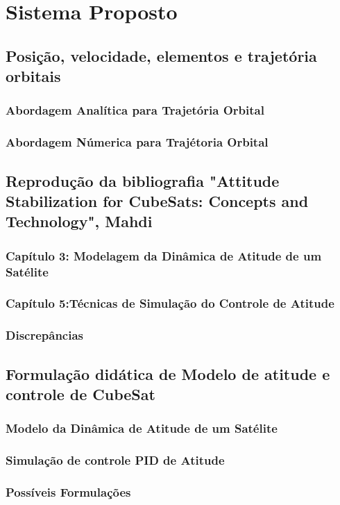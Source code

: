 \chapter{Sistema Proposto}\label{cap:proposta}

\lipsum[12]

\section{Posição, velocidade, elementos e trajetória orbitais}
\lipsum[12]
\subsection{Abordagem Analítica para Trajetória Orbital}
\lipsum[12]
\subsection{Abordagem Númerica para Trajétoria Orbital}
\lipsum[12]

\section{Reprodução da bibliografia "Attitude Stabilization for CubeSats: Concepts and Technology", Mahdi}
\lipsum[12]
\subsection{Capítulo 3: Modelagem da Dinâmica de Atitude de um Satélite}
\lipsum[12]
\subsection{Capítulo 5:Técnicas de Simulação do Controle de Atitude}
\lipsum[12]
\subsection{Discrepâncias}
\lipsum[12]

\section{Formulação didática de Modelo de atitude e controle de CubeSat}
\lipsum[12]
\subsection{Modelo da Dinâmica de Atitude de um Satélite}
\lipsum[12]
\subsection{Simulação de controle PID de Atitude}
\lipsum[12]
\subsection{Possíveis Formulações}
\lipsum[12]
